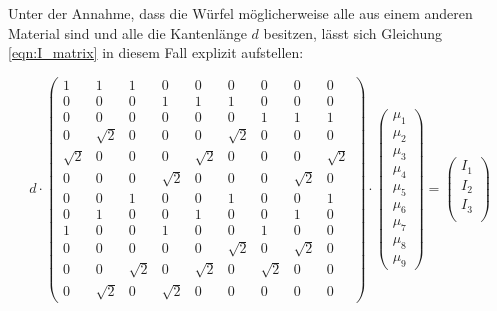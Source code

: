           \FloatBarrier


          Unter der Annahme, dass die Würfel möglicherweise alle aus einem anderen Material sind und alle die Kantenlänge $d$ besitzen, lässt sich Gleichung \ref{eqn:I_matrix} in diesem Fall explizit 
          aufstellen:
        
          \begin{equation}
            d \cdot
            \begin{pmatrix}
              1 & 1 & 1 & 0 & 0 & 0 & 0 & 0 & 0 \\
              0 & 0 & 0 & 1 & 1 & 1 & 0 & 0 & 0 \\
              0 & 0 & 0 & 0 & 0 & 0 & 1 & 1 & 1 \\
              0 & \sqrt{2} & 0 & 0 & 0 & \sqrt{2} & 0 & 0 & 0 \\
              \sqrt{2} & 0 & 0 & 0 & \sqrt{2} & 0 & 0 & 0 & \sqrt{2} \\
              0 & 0 & 0 & \sqrt{2} & 0 & 0 & 0 & \sqrt{2} & 0 \\
              0 & 0 & 1 & 0 & 0 & 1 & 0 & 0 & 1 \\
              0 & 1 & 0 & 0 & 1 & 0 & 0 & 1 & 0 \\
              1 & 0 & 0 & 1 & 0 & 0 & 1 & 0 & 0 \\
              0 & 0 & 0 & 0 & 0 & \sqrt{2} & 0 & \sqrt{2} & 0 \\
              0 & 0 & \sqrt{2} & 0 & \sqrt{2} & 0 & \sqrt{2} & 0 & 0 \\
              0 & \sqrt{2} & 0 & \sqrt{2} & 0 & 0 & 0 & 0 & 0 
            \end{pmatrix}
            \cdot
            \begin{pmatrix}
              \mu_1 \\
              \mu_2 \\
              \mu_3 \\
              \mu_4 \\
              \mu_5 \\
              \mu_6 \\
              \mu_7 \\
              \mu_8 \\
              \mu_9 
            \end{pmatrix}
            =
            \begin{pmatrix}
              I_1 \\
              I_2 \\
              I_3 \\

\end{pmatrix}
\end{equation}
